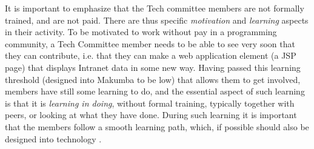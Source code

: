 \documentclass{llncs}
\begin{document}
It is important to emphasize that the Tech committee members are not formally trained, and are not paid. There are thus specific \textit{motivation} and \textit{learning} aspects in their activity. To be motivated to work without pay in a programming community, a Tech Committee member needs to be able to see very soon that they can contribute, i.e. that they can make a web application element (a JSP page) that displays Intranet data in some new way. Having passed this learning threshold (designed into Makumba to be low) that allows them to get involved, members have still some learning to do, and the essential aspect of such learning is that it is \textit {learning in doing}, without formal training, typically together with peers, or looking at what they have done. During such learning it is important that the members follow a smooth learning path, which, if possible should also be designed into technology \cite{bogdan_mayer09}.




\end{document}
